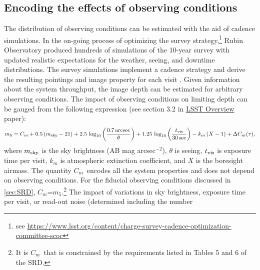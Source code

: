 \documentclass[PST,authoryear,toc]{lsstdoc}
\newcommand{\cm}{\ensuremath{C_m}}
\newcommand{\mf}{\ensuremath{m_5}}
\begin{document}
\subsection{Encoding the effects of observing conditions}\label{sec:Cm}

The distribution of observing conditions can be estimated with the aid of cadence simulations.  In the on-going process of optimizing the survey strategy,\footnote{see \href{https://www.lsst.org/content/charge-survey-cadence-optimization-committee-scoc}{{https://www.lsst.org/content/charge-survey-cadence-optimization-committee-scoc}}} Rubin Observatory produced hundreds of simulations of the 10-year survey with updated realistic expectations for the weather, seeing, and downtime distributions.  The survey simulations implement a cadence strategy and derive the resulting pointings and image property for each visit \citep{2019AJ....157..151N, 2016SPIE.9910E..13D, 2014SPIE.9150E..15D}. 
Given information about the system throughput, the image depth can be estimated for arbitrary observing conditions. The impact of observing conditions on limiting depth 
can be gauged from the following expression (see section 3.2 in
\href{https://ls.st/lop}{{LSST Overview}} paper): 
\begin{equation}
\label{eq:Cm}
m_5 = \cm + 0.5\,(m_{\rm sky} - 21) + 2.5\,\log_{10}\left(\frac{0.7 \, {\rm arcsec}}{\theta}\right) + 1.25\,\log_{10}\left(\frac{t_{\rm vis}}{ 30 \, {\rm sec}}\right) - k_m\,(X-1) + \Delta\cm(\tau),
\end{equation}
where $m_{\rm sky}$ is the sky brightness (AB mag arcsec$^{-2}$), $\theta$ is seeing, $t_{\rm vis}$ is exposure 
time per visit, $k_m$ is atmospheric extinction coefficient, and $X$ is the boresight airmass. 
The quantity \cm\ encodes all the system properties and does not depend on observing conditions.  For the fiducial observing conditions discussed in \autoref{sec:SRD}, \cm=\mf.\footnote{It is \cm\ that is constrained by the requirements listed in Tables 5 and 6 of the SRD.}
The impact of variations in sky brightness, exposure time per visit, or read-out noise (determined including the number 
\end{document}
